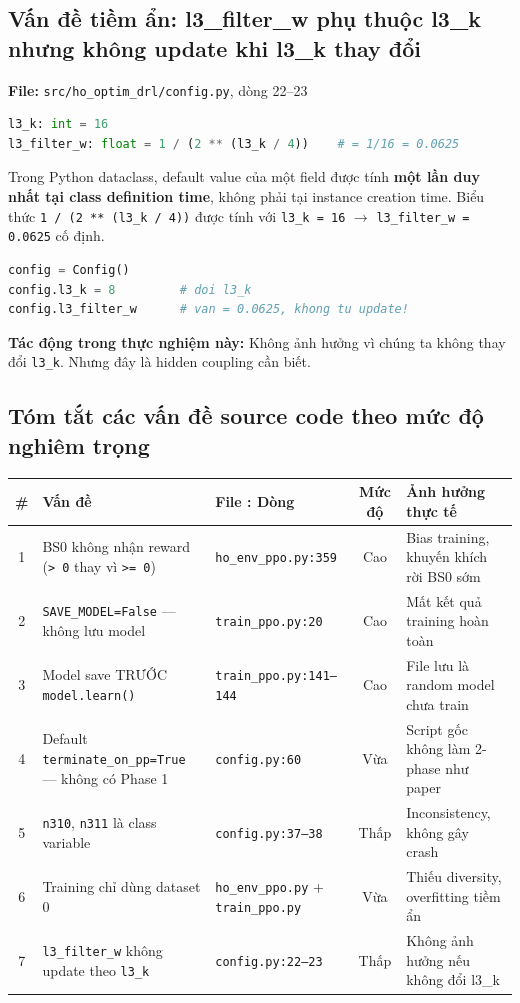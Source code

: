 \documentclass[11pt]{article}
\begin{document}
\subsection{Vấn đề tiềm ẩn: l3\_filter\_w phụ thuộc l3\_k nhưng không update khi l3\_k thay đổi}

\textbf{File:} \texttt{src/ho\_optim\_drl/config.py}, dòng 22--23

\begin{lstlisting}[language=Python]
l3_k: int = 16
l3_filter_w: float = 1 / (2 ** (l3_k / 4))    # = 1/16 = 0.0625
\end{lstlisting}

Trong Python dataclass, default value của một field được tính \textbf{một lần duy nhất tại class definition time}, không phải tại instance creation time. Biểu thức \texttt{1 / (2 ** (l3\_k / 4))} được tính với \texttt{l3\_k = 16} $\to$ \texttt{l3\_filter\_w = 0.0625} cố định.

\begin{lstlisting}[language=Python]
config = Config()
config.l3_k = 8         # doi l3_k
config.l3_filter_w      # van = 0.0625, khong tu update!
\end{lstlisting}

\textbf{Tác động trong thực nghiệm này:} Không ảnh hưởng vì chúng ta không thay đổi \texttt{l3\_k}. Nhưng đây là hidden coupling cần biết.

\subsection{Tóm tắt các vấn đề source code theo mức độ nghiêm trọng}

\begin{longtable}{@{}clp{2.5cm}cp{4cm}@{}}
\toprule
\textbf{\#} & \textbf{Vấn đề} & \textbf{File : Dòng} & \textbf{Mức độ} & \textbf{Ảnh hưởng thực tế} \\
\midrule
\endhead
1 & BS0 không nhận reward (\texttt{> 0} thay vì \texttt{>= 0}) & \texttt{ho\_env\_ppo.py:359} & Cao & Bias training, khuyến khích rời BS0 sớm \\
2 & \texttt{SAVE\_MODEL=False} --- không lưu model & \texttt{train\_ppo.py:20} & Cao & Mất kết quả training hoàn toàn \\
3 & Model save TRƯỚC \texttt{model.learn()} & \texttt{train\_ppo.py:141--144} & Cao & File lưu là random model chưa train \\
4 & Default \texttt{terminate\_on\_pp=True} --- không có Phase 1 & \texttt{config.py:60} & Vừa & Script gốc không làm 2-phase như paper \\
5 & \texttt{n310}, \texttt{n311} là class variable & \texttt{config.py:37--38} & Thấp & Inconsistency, không gây crash \\
6 & Training chỉ dùng dataset 0 & \texttt{ho\_env\_ppo.py} + \texttt{train\_ppo.py} & Vừa & Thiếu diversity, overfitting tiềm ẩn \\
7 & \texttt{l3\_filter\_w} không update theo \texttt{l3\_k} & \texttt{config.py:22--23} & Thấp & Không ảnh hưởng nếu không đổi l3\_k \\
\bottomrule
\end{longtable}
\end{document}
